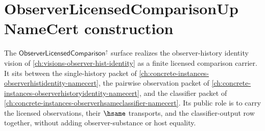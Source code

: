 \chapter{ObserverLicensedComparisonUp NameCert construction}
\label{ch:concrete-instances-observerlicensedcomparison-namecert}

The $\mathsf{ObserverLicensedComparison}^{\uparrow}$ surface realizes the observer-history identity vision of \autoref{ch:visions-observer-hist-identity} as a finite licensed comparison carrier. It sits between the single-history packet of \autoref{ch:concrete-instances-observerhistidentity-namecert}, the pairwise observation packet of \autoref{ch:concrete-instances-observerhistoryidentity-namecert}, and the classifier packet of \autoref{ch:concrete-instances-observerhsameclassifier-namecert}. Its public role is to carry the licensed observations, their $\hsame$ transports, and the classifier-output row together, without adding observer-substance or host equality.



